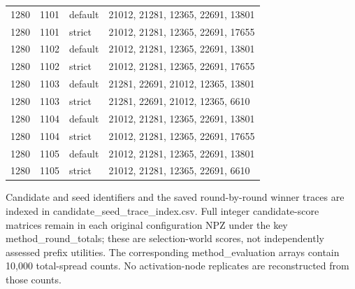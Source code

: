 \begin{longtable}{rrll}
1280 & 1101 & default & 21012, 21281, 12365, 22691, 13801 \\
1280 & 1101 & strict & 21012, 21281, 12365, 22691, 17655 \\
1280 & 1102 & default & 21012, 21281, 12365, 22691, 13801 \\
1280 & 1102 & strict & 21012, 21281, 12365, 22691, 17655 \\
1280 & 1103 & default & 21281, 22691, 21012, 12365, 13801 \\
1280 & 1103 & strict & 21281, 22691, 21012, 12365, 6610 \\
1280 & 1104 & default & 21012, 21281, 12365, 22691, 13801 \\
1280 & 1104 & strict & 21012, 21281, 12365, 22691, 17655 \\
1280 & 1105 & default & 21012, 21281, 12365, 22691, 13801 \\
1280 & 1105 & strict & 21012, 21281, 12365, 22691, 6610 \\
\bottomrule\end{longtable}
Candidate and seed identifiers and the saved round-by-round winner traces are indexed in candidate\_seed\_trace\_index.csv. Full integer candidate-score matrices remain in each original configuration NPZ under the key method\_round\_totals; these are selection-world scores, not independently assessed prefix utilities. The corresponding method\_evaluation arrays contain 10,000 total-spread counts. No activation-node replicates are reconstructed from those counts.